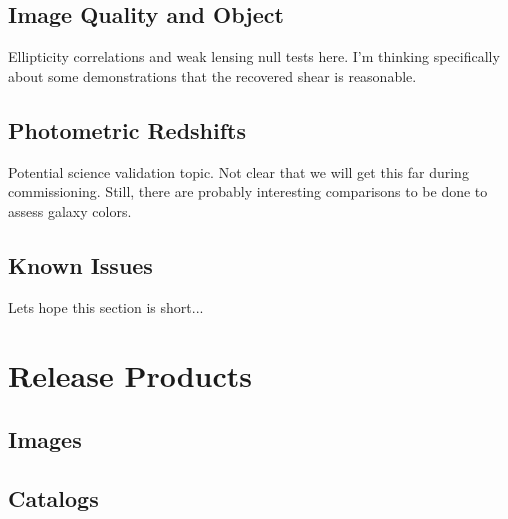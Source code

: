 \subsection{Image Quality and Object }

Ellipticity correlations and weak lensing null tests here. 
I'm thinking specifically about some demonstrations that the recovered shear is reasonable.

\subsection{Photometric Redshifts}

Potential science validation topic. Not clear that we will get this far during commissioning. Still, there are probably interesting comparisons to be done to assess galaxy colors.

\subsection{Known Issues}

Lets hope this section is short...

\section{Release Products}

\subsection{Images}

\subsection{Catalogs}

